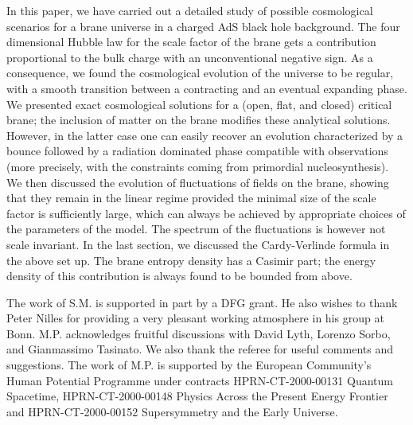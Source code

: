 \documentclass[a4paper,11pt]{article}
\begin{document}
In this paper, we have carried out a detailed study of possible
cosmological scenarios for a brane universe in a charged AdS black hole
background. The four dimensional Hubble law for the scale factor of the
brane gets a contribution proportional to the bulk  charge with an 
unconventional negative sign. As a consequence, we found the cosmological 
evolution of the universe to be regular, with a smooth transition between 
a contracting and an eventual expanding phase. We presented exact
cosmological solutions for a (open, flat, and closed) critical brane; the
inclusion of matter on the brane modifies these analytical solutions.
However, in the latter case one can easily recover an evolution
characterized by a bounce followed by a radiation dominated phase
compatible with observations (more precisely, with the constraints coming
from primordial nucleosynthesis). We then discussed the evolution of
fluctuations of fields on the brane, showing that they remain in the
linear regime provided the minimal size of the scale factor is
sufficiently large, which can always be achieved by appropriate choices of
the parameters of the model. The spectrum of the fluctuations is however
not scale invariant. In the last section, we discussed the Cardy-Verlinde
formula in the above set  up. The brane entropy density has a Casimir
part; the energy density of this contribution is always found to be
bounded from above.

\vskip 0.5cm

The work of S.M. is supported  in part by a DFG grant. He also wishes to 
thank Peter Nilles for providing a very pleasant working atmosphere in his
group at Bonn. M.P. acknowledges fruitful discussions with David Lyth,
Lorenzo Sorbo, and Gianmassimo Tasinato. We also thank the referee for
useful comments and suggestions. The work of M.P. is supported by the
European Community's Human Potential  Programme under contracts
HPRN-CT-2000-00131 Quantum Spacetime,  HPRN-CT-2000-00148 Physics Across
the Present Energy Frontier and  HPRN-CT-2000-00152 Supersymmetry and the
Early Universe.




\newpage
\end{document}
